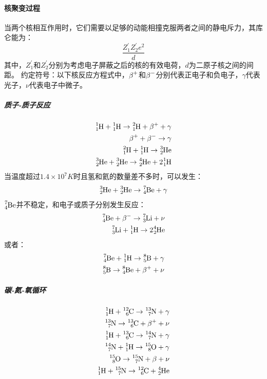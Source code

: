 \paragraph{核聚变过程}
当两个核相互作用时，它们需要以足够的动能相撞克服两者之间的静电斥力，其库仑能为：
\begin{equation}
	\frac{Z_{1}^\prime Z_{2}^\prime e^2}{d}
\end{equation}
其中，$Z_{1}^\prime$和$Z_{2}^\prime$分别为考虑电子屏蔽之后的核的有效电荷，$d$为二原子核之间的间距。
约定符号：以下核反应方程式中，$\ce{\beta+}$和$\ce{\beta-}$分别代表正电子和负电子，$\gamma$代表光子，$\nu$代表电子中微子。
\subparagraph{质子-质子反应}
\begin{equation}
	\begin{aligned}
		\ce{^{1}_{1}H}+\ce{^{1}_{1}H}\rightarrow\ce{^{2}_{1}H}+\ce{\beta+}+\gamma \\
		\ce{\beta+}+\ce{\beta-}\rightarrow \gamma\\
		\ce{^{2}_{1}H}+\ce{^{1}_{1}H}\rightarrow\ce{^{3}_{2}He}\\
		\ce{^{3}_{2}He}+\ce{^{3}_{2}He}\rightarrow\ce{^{4}_{2}He}+2\ce{^{1}_{1}H}
	\end{aligned}
\end{equation}
当温度超过$1.4\times 10^7K$时且氢和氦的数量差不多时，可以发生：
\begin{equation}
	\ce{^{3}_{2}He}+\ce{^{3}_{2}He}\rightarrow\ce{^{7}_{4}Be}+\gamma
\end{equation}
$\ce{^{7}_{4}Be}$并不稳定，和电子或质子分别发生反应：
\begin{equation}
	\begin{aligned}
		\ce{^{7}_{4}Be}+\ce{\beta-}\rightarrow\ce{^{7}_{3}Li}+\nu \\
		\ce{^{7}_{3}Li}+\ce{^{1}_{1}H}\rightarrow2\ce{^{4}_{2}He}
	\end{aligned}
\end{equation}
或者：
\begin{equation}
	\begin{aligned}
		\ce{^{7}_{4}Be}+\ce{^{1}_{1}H}\rightarrow \ce{^{8}_{5}B}+\gamma\\
		\ce{^{8}_{5}B}\rightarrow\ce{^{8}_{4}Be}+\ce{\beta+}+\nu
	\end{aligned}
\end{equation}
\subparagraph{碳-氮-氧循环}
\begin{equation}
	\begin{aligned}
		\ce{^{1}_{1}H}+\ce{^{12}_{6}C}\rightarrow\ce{^{13}_{7}N}+\gamma\\
		\ce{^{13}_{7}N}\rightarrow\ce{^{13}_{6}C}+\ce{\beta+}+\nu\\
		\ce{^{1}_{1}H}+\ce{^{13}_{6}C}\rightarrow\ce{^{14}_{7}N}+\gamma\\
		\ce{^{14}_{7}N}+\ce{^{1}_{1}H}\rightarrow\ce{^{15}_{8}O}+\gamma\\
		\ce{^{15}_{8}O}\rightarrow\ce{^{15}_{7}N}+\ce{\beta}+\nu\\
		\ce{^{1}_{1}H}+\ce{^{15}_{7}N}\rightarrow\ce{^{12}_{6}C}+\ce{^{4}_{2}He}
	\end{aligned}
\end{equation}

